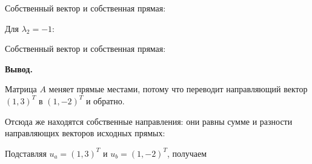 \documentclass[a4paper,14pt]{extarticle}
\begin{document}
Собственный вектор и собственная прямая: \begin{center}\end{center}

Для \(\lambda_2 = -1\): \begin{center}\end{center}

Собственный вектор и собственная прямая: \begin{center}\end{center}

\textbf{Вывод.}

Матрица \(A\) меняет прямые местами, потому что переводит направляющий
вектор \((1, 3)^T\) в \((1, -2)^T\) и обратно.

Отсюда же находятся собственные направления: они равны сумме и разности
направляющих векторов исходных прямых: \begin{center}\end{center}

Подставляя \(u_a = (1, 3)^T\) и \(u_b = (1, -2)^T\), получаем \begin{center}\end{center}
\end{document}
